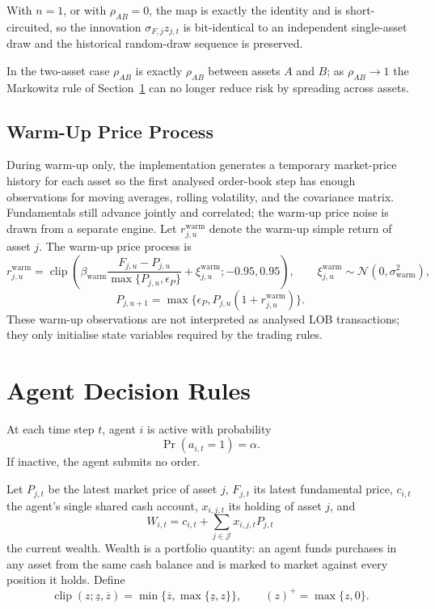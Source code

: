 \documentclass[12pt, a4paper]{article}
\DeclareMathOperator{\clip}{clip}
\newcommand{\pospart}[1]{\left(#1\right)^{+}}
\begin{document}
    With \(n=1\), or with \(\rho_{AB}=0\), the map is exactly the identity and is
    short-circuited, so the innovation \(\sigma_{F,j}z_{j,t}\) is bit-identical to
    an independent single-asset draw and the historical random-draw sequence is
    preserved.

    In the two-asset case \(\rho_{AB}\) is exactly \(\rho_{AB}\) between assets
    \(A\) and \(B\); as \(\rho_{AB}\to1\) the Markowitz rule of
    Section~\ref{sec:decision_rules} can no longer reduce risk by spreading
    across assets.

    \subsection{Warm-Up Price Process}

    During warm-up only, the implementation generates a temporary market-price
    history for each asset so the first analysed order-book step has enough
    observations for moving averages, rolling volatility, and the covariance
    matrix. Fundamentals still advance jointly and correlated; the warm-up price
    noise is drawn from a separate engine. Let \(r_{j,u}^{\mathrm{warm}}\) denote
    the warm-up simple return of asset \(j\). The warm-up price process is
    \[
        r_{j,u}^{\mathrm{warm}}
        =
        \clip\!\left(
                   \beta_{\mathrm{warm}}\frac{F_{j,u}-P_{j,u}}{\max\{P_{j,u},\epsilon_P\}}
                   +\xi_{j,u}^{\mathrm{warm}};
            -0.95,0.95
        \right),
        \qquad
        \xi_{j,u}^{\mathrm{warm}}\sim\mathcal{N}(0,\sigma_{\mathrm{warm}}^2),
    \]
    \[
        P_{j,u+1}=\max\{\epsilon_P,P_{j,u}(1+r_{j,u}^{\mathrm{warm}})\}.
    \]
    These warm-up observations are not interpreted as analysed LOB transactions;
    they only initialise state variables required by the trading rules.

    \section{Agent Decision Rules}\label{sec:decision_rules}

    At each time step \(t\), agent \(i\) is active with probability
    \[
        \Pr(a_{i,t}=1)=\alpha.
    \]
    If inactive, the agent submits no order.

    Let \(P_{j,t}\) be the latest market price of asset \(j\), \(F_{j,t}\) its
    latest fundamental price, \(c_{i,t}\) the agent's single shared cash account,
    \(x_{i,j,t}\) its holding of asset \(j\), and
    \[
        W_{i,t}=c_{i,t}+\sum_{j\in\mathcal{J}}x_{i,j,t}P_{j,t}
    \]
    the current wealth. Wealth is a portfolio quantity: an agent funds purchases in
    any asset from the same cash balance and is marked to market against every
    position it holds. Define
    \[
        \clip(z;\underline z,\overline z)=\min\{\overline z,\max\{\underline z,z\}\},
        \qquad
        \pospart{z}=\max\{z,0\}.
    \]
\end{document}
